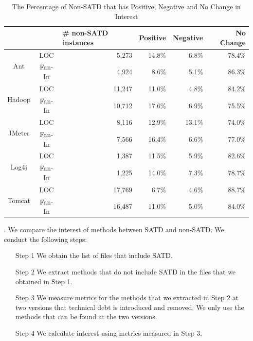 \documentclass[review]{elsarticle}
\newcommand{\smallsection}[1]{\vspace{1mm}\noindent {\bf #1}.\hspace{2mm}}
\begin{document}
\begin{table}[tb]
  \caption{The Percentage of Non-SATD that has Positive, Negative and No Change in Interest}
  \label{tab:percentage_non-SATD} 
  \centering

  \begin{tabular}{cc|p{0.65in}|rrr}
  \hline
        & & \textbf{\# non-SATD instances} & \textbf{Positive} & \textbf{Negative} & \textbf{No Change} \\
  \hline
\multirow{2}{*}{Ant} &  LOC  & \multicolumn{1}{r|}{5,273} &  14.8\%  &  6.8\% & 78.4\%\\
                   & Fan-In  & \multicolumn{1}{r|}{4,924} &  8.6\%  &  5.1\% & 86.3\%\\
  \hline
\multirow{2}{*}{Hadoop} &  LOC  & \multicolumn{1}{r|}{11,247} &  11.0\%  &  4.8\% & 84.2\%\\
                      & Fan-In  & \multicolumn{1}{r|}{10,712} &  17.6\%  &  6.9\% & 75.5\%\\
  \hline
\multirow{2}{*}{JMeter} &  LOC  & \multicolumn{1}{r|}{8,116} &  12.9\%  &  13.1\% & 74.0\%\\
                      & Fan-In  & \multicolumn{1}{r|}{7,566} &  16.4\%  &  6.6\% & 77.0\%\\
  \hline
\multirow{2}{*}{Log4j} &  LOC  & \multicolumn{1}{r|}{1,387} &  11.5\%  &  5.9\% & 82.6\%\\
                     & Fan-In  & \multicolumn{1}{r|}{1,225} &  14.0\%  &  7.3\% & 78.7\%\\
  \hline
\multirow{2}{*}{Tomcat} &  LOC  & \multicolumn{1}{r|}{17,769} &  6.7\%  &  4.6\% & 88.7\%\\
                      & Fan-In  & \multicolumn{1}{r|}{16,487} &  11.0\%  &  5.0\% & 84.0\%\\
  \hline
  \end{tabular}
\end{table}


\smallsection{Approach}
We compare the interest of methods between SATD and non-SATD.
We conduct the following steps:
\begin{itemize}
\item [Step 1] We obtain the list of files that include SATD. %
\item [Step 2] We extract methods that do not include SATD in the files that we obtained in Step 1. %
\item [Step 3] We measure metrics for the methods that we extracted in Step 2 at two versions that technical debt is introduced and removed. We only use the methods that can be found at the two versions.
\item [Step 4] We calculate interest using metrics measured in Step 3.
\end{itemize}
\end{document}
